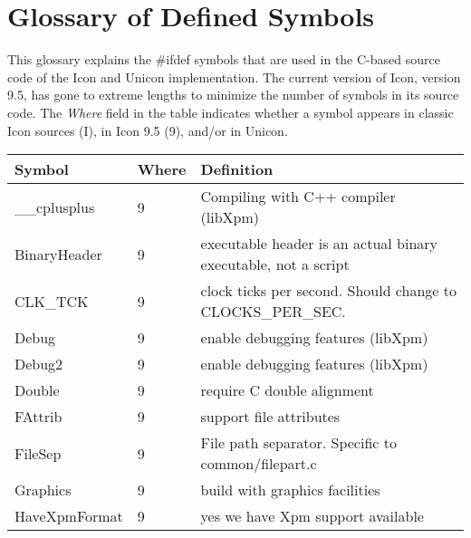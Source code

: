 \chapter{Glossary of Defined Symbols}

This glossary explains the \#ifdef symbols that are used in the
C-based source code of the Icon and Unicon implementation.  The
current version of Icon, version 9.5, has gone to extreme lengths
to minimize the number of symbols in its source code. The {\em Where\/}
field in the table indicates whether a symbol appears in classic Icon
sources (I), in Icon 9.5 (9), and/or in Unicon.

\bigskip


\begin{xtabular}{|m{1.8in}|m{0.5in}|m{4.0in}|}
\hline
Symbol & Where & Definition \\ \hline
\_\_cplusplus & 9 & Compiling with C++ compiler (libXpm) \\
BinaryHeader & 9 & executable header is an actual binary executable,
		not a script \\
CLK\_TCK & 9 & clock ticks per second. Should change to CLOCKS\_PER\_SEC. \\
Debug & 9 & enable debugging features (libXpm) \\
Debug2 & 9 & enable debugging features (libXpm) \\
Double & 9 & require C double alignment \\
FAttrib & 9 & support file attributes \\
FileSep & 9 & File path separator. Specific to common/filepart.c \\
Graphics & 9 & build with graphics facilities \\
HaveXpmFormat & 9 & yes we have Xpm support available \\
\hline
\end{xtabular}
